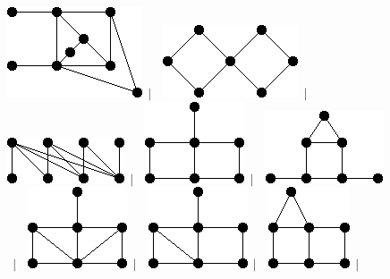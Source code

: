 \documentclass[11pt,paper=b5,footinclude,headinclude]{scrbook} %
\newtheorem{ex}{Vaja\hypertarget{sol:\theex}}[chapter]
\begin{document}
\begin{ex}
\begin{figure}
\includegraphics[scale=0.5]{smallGraphs/g_X24.png}$\,\mid\,$\
\includegraphics[scale=0.5]{smallGraphs/g_X27.png}$\,\mid\,$\
\includegraphics[scale=0.5]{smallGraphs/g_X29.png}$\,\mid\,$\
\includegraphics[scale=0.5]{smallGraphs/g_X3.png}$\,\mid\,$\
\includegraphics[scale=0.5]{smallGraphs/g_X30.png}$\,\mid\,$\
\includegraphics[scale=0.5]{smallGraphs/g_X31.png}$\,\mid\,$\
\includegraphics[scale=0.5]{smallGraphs/g_X32.png}$\,\mid\,$\
\includegraphics[scale=0.5]{smallGraphs/g_X33.png}$\,\mid\,$\

\end{figure}
\end{ex}
\end{document}
